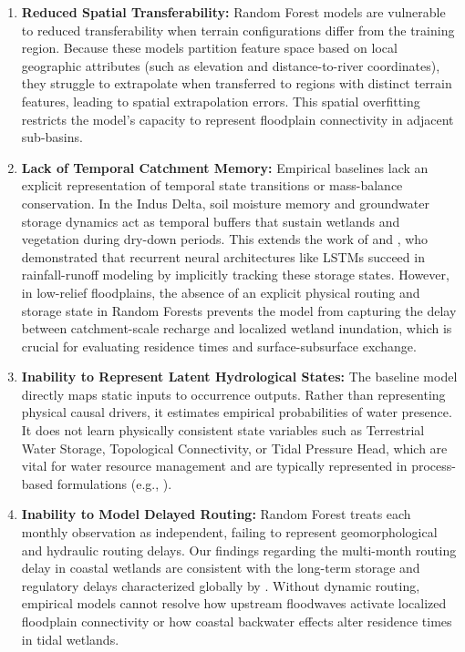 \begin{enumerate}
    \item \textbf{Reduced Spatial Transferability:} Random Forest models are vulnerable to reduced transferability when terrain configurations differ from the training region. Because these models partition feature space based on local geographic attributes (such as elevation and distance-to-river coordinates), they struggle to extrapolate when transferred to regions with distinct terrain features, leading to spatial extrapolation errors. This spatial overfitting restricts the model's capacity to represent floodplain connectivity in adjacent sub-basins.
    \item \textbf{Lack of Temporal Catchment Memory:} Empirical baselines lack an explicit representation of temporal state transitions or mass-balance conservation. In the Indus Delta, soil moisture memory and groundwater storage dynamics act as temporal buffers that sustain wetlands and vegetation during dry-down periods. This extends the work of \citet{Kratzert2018} and \citet{Nearing2020What}, who demonstrated that recurrent neural architectures like LSTMs succeed in rainfall-runoff modeling by implicitly tracking these storage states. However, in low-relief floodplains, the absence of an explicit physical routing and storage state in Random Forests prevents the model from capturing the delay between catchment-scale recharge and localized wetland inundation, which is crucial for evaluating residence times and surface-subsurface exchange.
    \item \textbf{Inability to Represent Latent Hydrological States:} The baseline model directly maps static inputs to occurrence outputs. Rather than representing physical causal drivers, it estimates empirical probabilities of water presence. It does not learn physically consistent state variables such as Terrestrial Water Storage, Topological Connectivity, or Tidal Pressure Head, which are vital for water resource management and are typically represented in process-based formulations (e.g., \citealp{Feng2023The}).
    \item \textbf{Inability to Model Delayed Routing:} Random Forest treats each monthly observation as independent, failing to represent geomorphological and hydraulic routing delays. Our findings regarding the multi-month routing delay in coastal wetlands are consistent with the long-term storage and regulatory delays characterized globally by \citet{Scanlon2023Global}. Without dynamic routing, empirical models cannot resolve how upstream floodwaves activate localized floodplain connectivity or how coastal backwater effects alter residence times in tidal wetlands.
\end{enumerate}


